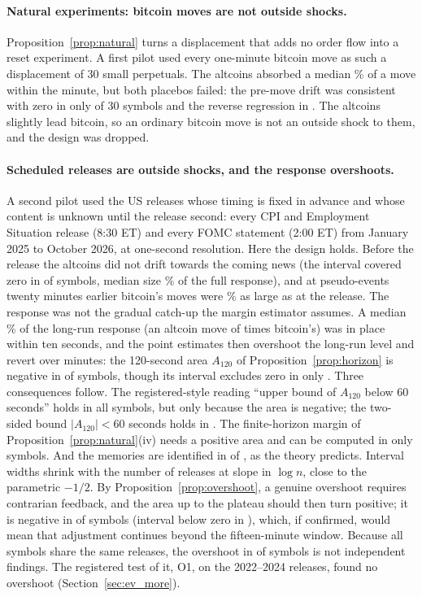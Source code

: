 \paragraph{Natural experiments: bitcoin moves are not outside shocks.} Proposition~\ref{prop:natural} turns a displacement that adds no order flow into a reset experiment. A first pilot used every one-minute bitcoin move as such a displacement of 30 small perpetuals. The altcoins absorbed a median \PtwoPassThrough\% of a move within the minute, but both placebos failed: the pre-move drift was consistent with zero in only \PtwoPreOK{} of 30 symbols and the reverse regression in \PtwoReverseOK{}. The altcoins slightly lead bitcoin, so an ordinary bitcoin move is not an outside shock to them, and the design was dropped.

\paragraph{Scheduled releases are outside shocks, and the response overshoots.} A second pilot used the \PtwobEvents{} US releases whose timing is fixed in advance and whose content is unknown until the release second: every CPI and Employment Situation release (8:30 ET) and every FOMC statement (2:00 ET) from January 2025 to October 2026, at one-second resolution. Here the design holds. Before the release the altcoins did not drift towards the coming news (the interval covered zero in \PtwobPreOK{} of \PtwobSymbols{} symbols, median size \PtwobPreSize\% of the full response), and at pseudo-events twenty minutes earlier bitcoin's moves were \PtwobPseudo\% as large as at the release. The response was not the gradual catch-up the margin estimator assumes. A median \PtwobShare\% of the long-run response (an altcoin move of \PtwobBeta{} times bitcoin's) was in place within ten seconds, and the point estimates then overshoot the long-run level and revert over minutes: the 120-second area $A_{120}$ of Proposition~\ref{prop:horizon} is negative in \PtwobNegArea{} of \PtwobSymbols{} symbols, though its interval excludes zero in only \PtwobNegAreaSig{}. Three consequences follow. The registered-style reading ``upper bound of $A_{120}$ below 60 seconds'' holds in all \PtwobOneSided{} symbols, but only because the area is negative; the two-sided bound $|A_{120}|<60$ seconds holds in \PtwobTwoSided{}. The finite-horizon margin of Proposition~\ref{prop:natural}(iv) needs a positive area and can be computed in only \PtwobPosArea{} symbols. And the memories are identified in \PtwobIdentified{} of \PtwobSymbols{}, as the theory predicts. Interval widths shrink with the number of releases at slope \PtwobSlope{} in $\log n$, close to the parametric $-1/2$. By Proposition~\ref{prop:overshoot}, a genuine overshoot requires contrarian feedback, and the area up to the plateau should then turn positive; it is negative in \PtwobNegTotal{} of \PtwobSymbols{} symbols (interval below zero in \PtwobNegTotalSig{}), which, if confirmed, would mean that adjustment continues beyond the fifteen-minute window. Because all symbols share the same releases, the overshoot in \PtwobNegArea{} of \PtwobSymbols{} symbols is not \PtwobSymbols{} independent findings. The registered test of it, O1, on the 2022--2024 releases, found no overshoot (Section~\ref{sec:ev_more}).


